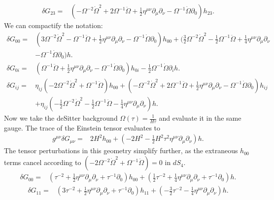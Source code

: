 \documentclass[10pt,letterpaper]{article}
\begin{document}
\begin{align}
\delta G_{23}={}&(- \Omega^{-2} \dot{\Omega}^2
 + 2 \Omega^{-1} \ddot{\Omega}
 + \tfrac{1}{2} \eta^{\mu \nu} \partial_{\mu} \partial_{\nu}
 -  \Omega^{-1} \dot{\Omega} \partial_{0}) h_{23}.
\end{align}
We can compactify the notation:
\begin{align}
\delta G_{00}={}&(3 \Omega^{-2} \dot{\Omega}^2
 -  \Omega^{-1} \ddot{\Omega}
 + \tfrac{1}{2} \eta^{\mu \nu} \partial_{\mu} \partial_{\nu}
 -  \Omega^{-1} \dot{\Omega} \partial_{0}) h_{00}
 + (\tfrac{3}{2} \Omega^{-2} \dot{\Omega}^2
 -  \tfrac{1}{2} \Omega^{-1} \ddot{\Omega}
 + \tfrac{1}{4} \eta^{\mu \nu} \partial_{\mu} \partial_{\nu}\nonumber\\
& -  \Omega^{-1} \dot{\Omega} \partial_{0}) h.
\\
\delta G_{0i}={}&(\Omega^{-1} \ddot{\Omega}
 + \tfrac{1}{2} \eta^{\mu \nu} \partial_{\mu} \partial_{\nu}
 -  \Omega^{-1} \dot{\Omega} \partial_{0}) h_{0i}
 -  \tfrac{1}{2} \Omega^{-1} \dot{\Omega} \partial_{i} h.
\\
\delta G_{ij}={}&\eta_{ij}(-2 \Omega^{-2} \dot{\Omega}^2
 + \Omega^{-1} \ddot{\Omega}) h_{00}
 + (- \Omega^{-2} \dot{\Omega}^2
 + 2 \Omega^{-1} \ddot{\Omega}
 + \tfrac{1}{2} \eta^{\mu \nu} \partial_{\mu} \partial_{\nu}
 -  \Omega^{-1} \dot{\Omega} \partial_{0}) h_{ij}\nonumber\\
& +\eta_{ij}(- \tfrac{1}{2} \Omega^{-2} \dot{\Omega}^2
 -  \tfrac{1}{2} \Omega^{-1} \ddot{\Omega}
 -  \tfrac{1}{4} \eta^{\mu \nu} \partial_{\mu} \partial_{\nu}) h.
\end{align}
Now we take the deSitter background $\Omega(\tau) = \frac{1}{H\tau}$ and evaluate it in the same gauge. 
The trace of the Einstein tensor evaluates to 
\begin{align}
g^{\mu\nu}\delta G_{\mu\nu}={}&2 H^2 h_{00}
 + (-2 H^2
 -  \tfrac{1}{2} H^2 \tau^2 \eta^{\mu \nu} \partial_{\mu} \partial_{\nu}) h.
\end{align}
The tensor perturbations in this geometry simplify further, as the extraneous $h_{00}$ terms cancel according to $(-2 \Omega^{-2} \dot{\Omega}^2
 + \Omega^{-1} \ddot{\Omega}) = 0$ in $dS_4$. 
\begin{align}
\delta G_{00}={}&(\tau^{-2}
 + \tfrac{1}{2} \eta^{\mu \nu} \partial_{\mu} \partial_{\nu}
 + \tau^{-1} \partial_{0}) h_{00}
 + (\tfrac{1}{2} \tau^{-2}
 + \tfrac{1}{4} \eta^{\mu \nu} \partial_{\mu} \partial_{\nu}
 + \tau^{-1} \partial_{0}) h.
\end{align}
\begin{align}
\delta G_{11}={}&(3 \tau^{-2}
 + \tfrac{1}{2} \eta^{\mu \nu} \partial_{\mu} \partial_{\nu}
 + \tau^{-1} \partial_{0}) h_{11}
 + (- \tfrac{3}{2} \tau^{-2}
 -  \tfrac{1}{4} \eta^{\mu \nu} \partial_{\mu} \partial_{\nu}) h.
\end{align}
\end{document}
